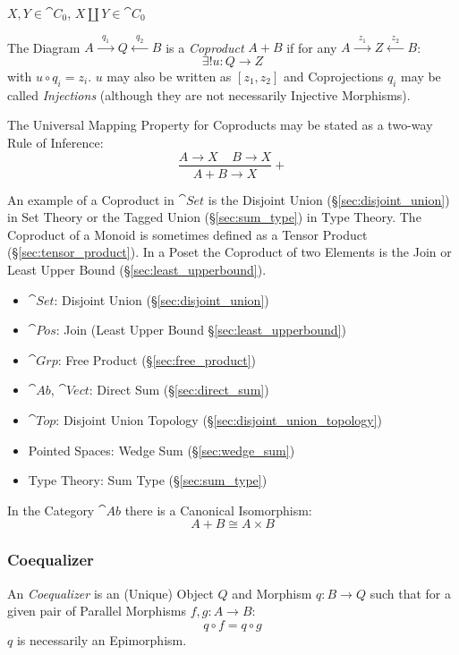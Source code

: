 $X,Y \in \cat{C}_0$, $X \amalg Y \in \cat{C}_0$

The Diagram $A \xrightarrow{\;\;q_1\;\;} Q \xleftarrow{\;\;q_2\;\;} B$
is a \emph{Coproduct} $A + B$ if for any $A \xrightarrow{\;\;z_1\;\;}
Z \xleftarrow{\;\;z_2\;\;} B$:
\[
  \exists!u : Q \rightarrow Z
\]
with $u \circ q_i = z_i$. $u$ may also be written as $[ z_1, z_2 ]$
and Coprojections $q_i$ may be called \emph{Injections} (although they
are not necessarily Injective Morphisms).

The Universal Mapping Property for Coproducts may be stated as a
two-way Rule of Inference:
\[
  {
    \frac{A \rightarrow X \;\;\;\; B \rightarrow X}
    {A + B \rightarrow X}
  }+
\]

An example of a Coproduct in $\cat{Set}$ is the Disjoint Union
(\S\ref{sec:disjoint_union}) in Set Theory or the Tagged Union
(\S\ref{sec:sum_type}) in Type Theory. The Coproduct of a Monoid is
sometimes defined as a Tensor Product (\S\ref{sec:tensor_product}). In
a Poset the Coproduct of two Elements is the Join or Least Upper Bound
(\S\ref{sec:least_upperbound}).

\begin{itemize}
\item $\cat{Set}$: Disjoint Union (\S\ref{sec:disjoint_union})
\item $\cat{Pos}$: Join (Least Upper Bound
  \S\ref{sec:least_upperbound})
\item $\cat{Grp}$: Free Product (\S\ref{sec:free_product})
\item $\cat{Ab}$, $\cat{Vect}$: Direct Sum (\S\ref{sec:direct_sum})
\item $\cat{Top}$: Disjoint Union Topology
  (\S\ref{sec:disjoint_union_topology})
\item Pointed Spaces: Wedge Sum (\S\ref{sec:wedge_sum})
\item Type Theory: Sum Type (\S\ref{sec:sum_type})
\end{itemize}

In the Category $\cat{Ab}$ there is a Canonical
Isomorphism:\cite{awodey06}
\[
  A + B \cong A \times B
\]



\subsubsection{Coequalizer}\label{sec:coequalizer}

An \emph{Coequalizer} is an (Unique) Object $Q$ and Morphism $q: B
\rightarrow Q$ such that for a given pair of Parallel Morphisms $f,g :
A \rightarrow B$:
\[
  q \circ f = q \circ g
\]
$q$ is necessarily an Epimorphism.

